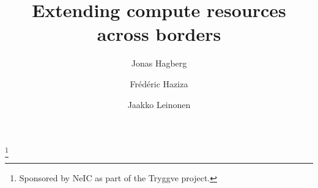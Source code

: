 
\title{Extending compute resources across borders}

\author{Jonas Hagberg}

\author{Fr\'ed\'eric Haziza}

\author{Jaakko Leinonen}

\thanks{Sponsored by NeIC as part of the Tryggve project.}



